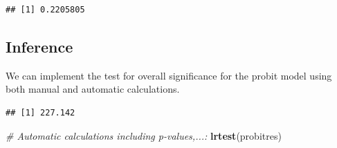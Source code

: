 \documentclass[]{book}
\newenvironment{Shaded}{\begin{snugshade}}{\end{snugshade}}
\newcommand{\CommentTok}[1]{\textcolor[rgb]{0.56,0.35,0.01}{\textit{#1}}}
\newcommand{\DecValTok}[1]{\textcolor[rgb]{0.00,0.00,0.81}{#1}}
\newcommand{\KeywordTok}[1]{\textcolor[rgb]{0.13,0.29,0.53}{\textbf{#1}}}
\newcommand{\NormalTok}[1]{#1}
\newcommand{\OperatorTok}[1]{\textcolor[rgb]{0.81,0.36,0.00}{\textbf{#1}}}
\newcommand{\StringTok}[1]{\textcolor[rgb]{0.31,0.60,0.02}{#1}}
\begin{document}
\begin{Shaded}
\end{Shaded}

\begin{verbatim}
## [1] 0.2205805
\end{verbatim}

\hypertarget{inference}{%
\subsection{Inference}\label{inference}}

We can implement the test for overall significance for the probit model
using both manual and automatic calculations.

\begin{Shaded}
\end{Shaded}

\begin{verbatim}
## [1] 227.142
\end{verbatim}

\begin{Shaded}
\begin{Highlighting}[]
\CommentTok{# Automatic calculations including p-values,...:}
\KeywordTok{lrtest}\NormalTok{(probitres)}
\end{Highlighting}
\end{Shaded}
\end{document}
